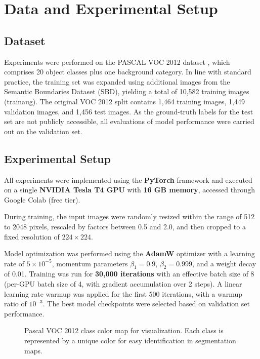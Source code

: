 \section{Data and Experimental Setup}
\label{sec:data_and_experimental_setup}

\subsection{Dataset}
\label{subsec:dataset}
Experiments were performed on the PASCAL VOC 2012 dataset \cite{voc2012}, which comprises 20 object classes plus one background category. In line with standard practice, the training set was expanded using additional images from the Semantic Boundaries Dataset (SBD), yielding a total of 10,582 training images (trainaug). The original VOC 2012 split contains 1,464 training images, 1,449 validation images, and 1,456 test images. As the ground-truth labels for the test set are not publicly accessible, all evaluations of model performance were carried out on the validation set.

\subsection{Experimental Setup}
\label{subsec:experimental_setup}
All experiments were implemented using the \textbf{PyTorch} framework and executed on a single \textbf{NVIDIA Tesla T4 GPU} with \textbf{16 GB memory}, accessed through Google Colab (free tier).

During training, the input images were randomly resized within the range of 512 to 2048 pixels, rescaled by factors between 0.5 and 2.0, and then cropped to a fixed resolution of $224 \times 224$.

Model optimization was performed using the \textbf{AdamW} optimizer with a learning rate of $5 \times 10^{-5}$, momentum parameters $\beta_1 = 0.9$, $\beta_2 = 0.999$, and a weight decay of 0.01. Training was run for \textbf{30,000 iterations} with an effective batch size of 8 (per-GPU batch size of 4, with gradient accumulation over 2 steps). A linear learning rate warmup was applied for the first 500 iterations, with a warmup ratio of $10^{-3}$. The best model checkpoints were selected based on validation set performance.

\begin{figure}[t]
    \centering
    \caption{Pascal VOC 2012 class color map for visualization. Each class is represented by a unique color for easy identification in segmentation maps.}
    \label{fig:class_colors_voc2012}
\end{figure}


